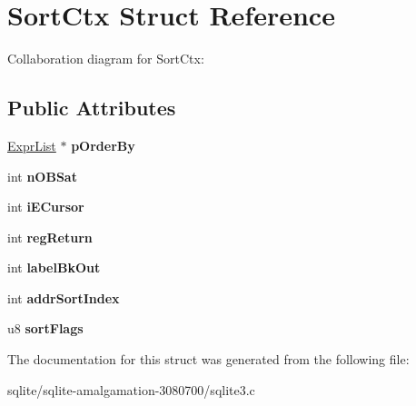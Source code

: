 \hypertarget{struct_sort_ctx}{\section{Sort\+Ctx Struct Reference}
\label{struct_sort_ctx}
}


Collaboration diagram for Sort\+Ctx\+:
\subsection*{Public Attributes}
\begin{DoxyCompactItemize}
\item 
\hypertarget{struct_sort_ctx_a4c1f59510d6e08b38c958c358d31ba07}{\hyperlink{struct_expr_list}{Expr\+List} $\ast$ {\bfseries p\+Order\+By}}\label{struct_sort_ctx_a4c1f59510d6e08b38c958c358d31ba07}

\item 
\hypertarget{struct_sort_ctx_a32e424bbae6b3e56a0959738eaaaf1d2}{int {\bfseries n\+O\+B\+Sat}}\label{struct_sort_ctx_a32e424bbae6b3e56a0959738eaaaf1d2}

\item 
\hypertarget{struct_sort_ctx_acaf1633a51ccc836edd0594f90ed501b}{int {\bfseries i\+E\+Cursor}}\label{struct_sort_ctx_acaf1633a51ccc836edd0594f90ed501b}

\item 
\hypertarget{struct_sort_ctx_a78017ace0acd29ba15652e389d9f90f6}{int {\bfseries reg\+Return}}\label{struct_sort_ctx_a78017ace0acd29ba15652e389d9f90f6}

\item 
\hypertarget{struct_sort_ctx_abc19dcb503656023d5596aa31378e973}{int {\bfseries label\+Bk\+Out}}\label{struct_sort_ctx_abc19dcb503656023d5596aa31378e973}

\item 
\hypertarget{struct_sort_ctx_ad4c264de37b3f3b9bbff55e34659ef11}{int {\bfseries addr\+Sort\+Index}}\label{struct_sort_ctx_ad4c264de37b3f3b9bbff55e34659ef11}

\item 
\hypertarget{struct_sort_ctx_aca4654bd8cf3789c3a1b05d144e3ce2c}{u8 {\bfseries sort\+Flags}}\label{struct_sort_ctx_aca4654bd8cf3789c3a1b05d144e3ce2c}

\end{DoxyCompactItemize}


The documentation for this struct was generated from the following file\+:\begin{DoxyCompactItemize}
\item 
sqlite/sqlite-\/amalgamation-\/3080700/sqlite3.\+c\end{DoxyCompactItemize}
